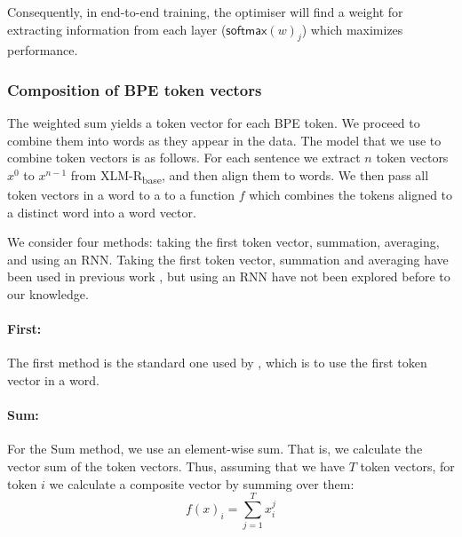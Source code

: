 \documentclass[11pt]{article}
\newcommand\jp[1]{(\textbf{JP:} #1)}
\newcommand\citet{\newcite}
\newcommand\citep{\cite}
\newcommand\softmax{\mathsf{softmax}}
\begin{document}
    
    
     Consequently, in end-to-end training, the optimiser will find a
     weight for extracting information from each layer
     ($\softmax(w)_j$) which maximizes performance.

     \subsubsection{Composition of BPE token vectors}
          The weighted sum yields a token vector for each BPE token. We
     proceed to combine them into words as they appear in the data.
      The model that we use to combine token vectors is as
     follows. For each sentence we extract $n$ token vectors $x^0$ to
     $x^{n-1}$ from XLM-R\textsubscript{base}, and then align them to words.
                We then pass all token vectors in a word to a to a
     function $f$ which combines the tokens aligned to a distinct word
     into a word vector.
    


    

                    We consider four methods: taking the first
     token vector, summation, averaging, and using an RNN. Taking the first
     token vector, summation and averaging have been used in previous
     work \citep{sachan2020syntax,kondratyuk2019cross,devlin2018bert},
     but using an RNN have not been explored before to our knowledge.

        \paragraph{First:} The first method is the standard one used by
     \citet{devlin2018bert}, which is to use the first token vector in a word.
    
     \paragraph{Sum:} For the Sum method, we use an element-wise
     sum. That is, we calculate the vector sum of the token
     vectors. Thus, assuming that we have $T$ token vectors, for token $i$ we calculate a composite vector
     by summing over them:
	\begin{equation}
	f(x)_i = \sum_{j=1}^{T} x_i^j
	\end{equation}
\end{document}
